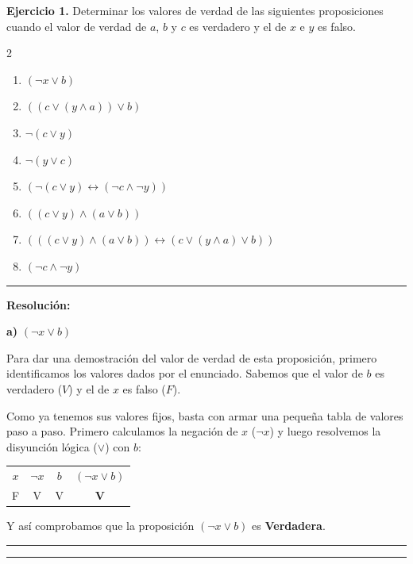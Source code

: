 \hypertarget{ej1}{}
\hypertarget{ej1}{}
\noindent \textbf{Ejercicio 1.} Determinar los valores de verdad de las siguientes proposiciones cuando el valor de verdad de $a$, $b$ y $c$ es verdadero y el de $x$ e $y$ es falso.

\begin{multicols}{2}
\begin{enumerate}[label=\alph*)]
    \item $(\neg x \vee b)$
    \item $((c \vee (y \wedge a)) \vee b)$
    \item $\neg(c \vee y)$
    \item $\neg(y \vee c)$
    \item $(\neg(c \vee y) \leftrightarrow (\neg c \wedge \neg y))$
    \item $((c \vee y) \wedge (a \vee b))$
    \item $(((c \vee y) \wedge (a \vee b)) \leftrightarrow (c \vee (y \wedge a) \vee b))$
    \item $(\neg c \wedge \neg y)$
\end{enumerate}
\end{multicols}

\vspace{0.2cm}
{\color{gray}\hrule}
\vspace{0.4cm}

\textbf{Resolución:}

\textbf{a)} $(\neg x \vee b)$

Para dar una demostración del valor de verdad de esta proposición, primero identificamos 
los valores dados por el enunciado. Sabemos que el valor de $b$ es verdadero ($V$) y el de $x$ es falso ($F$). 

Como ya tenemos sus valores fijos, basta con armar una pequeña tabla de valores paso a paso. Primero calculamos la negación de $x$ ($\neg x$) y luego resolvemos la disyunción lógica ($\vee$) con $b$:

\begin{center}
\begin{tabular}{|c|c|c|c|}

$x$ & $\neg x$ & $b$ & $(\neg x \vee b)$ \\
F & V & V & \textbf{V} \\
\end{tabular}
\end{center}

Y así comprobamos que la proposición $(\neg x \vee b)$ es \textbf{Verdadera}.

\vspace{0.5cm}
\aportar
\hrule
\vspace{0.5cm}
\aportar
\hrule
\vspace{0.5cm}
